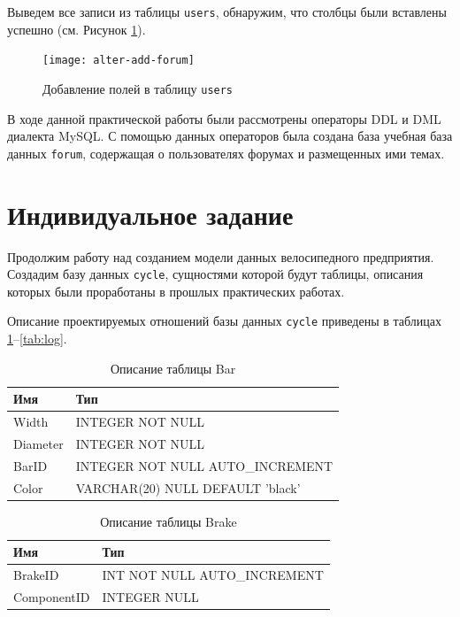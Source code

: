 Выведем все записи из таблицы \texttt{users}, обнаружим, что столбцы были вставлены успешно (см. Рисунок \ref{fig:alter-add-forum}).

\begin{figure}[h!]
	\centering
	\texttt{[image: alter-add-forum]}
	\caption{Добавление полей в таблицу \texttt{users}}
	\label{fig:alter-add-forum}
\end{figure}

В ходе данной практической работы были рассмотрены операторы DDL и DML диалекта MySQL. С помощью данных операторов была создана база учебная база данных \texttt{forum}, содержащая о пользователях форумах и размещенных ими темах.

\section{Индивидуальное задание}

Продолжим работу над созданием модели данных велосипедного предприятия. Создадим базу данных \texttt{cycle}, сущностями  которой будут таблицы, описания которых были проработаны в прошлых практических работах. 

Описание проектируемых отношений базы данных \texttt{cycle} приведены в таблицах \ref{tab:bar}--\ref{tab:log}.

\begin{table}[h!] 
	\centering
	\caption{Описание таблицы Bar}
	\begin{tabular}{|l|l|}
		\hline \textbf{Имя} & \textbf{Тип} \\
		\hline
		Width & INTEGER NOT NULL \\ \hline
		Diameter & INTEGER NOT NULL \\ \hline
		BarID & INTEGER NOT NULL AUTO\_INCREMENT \\ \hline
		Color & VARCHAR(20) NULL DEFAULT 'black' \\ \hline
	\end{tabular}
	\label{tab:bar}
\end{table}

\begin{table}[h!] 
	\centering
	\caption{Описание таблицы Brake}
	\begin{tabular}{|l|l|}
		\hline \textbf{Имя} & \textbf{Тип} \\
		\hline
		BrakeID &       INT NOT NULL AUTO\_INCREMENT \\ \hline
		ComponentID &   INTEGER NULL \\ \hline
	\end{tabular}
	\label{tab:brake}
\end{table}


